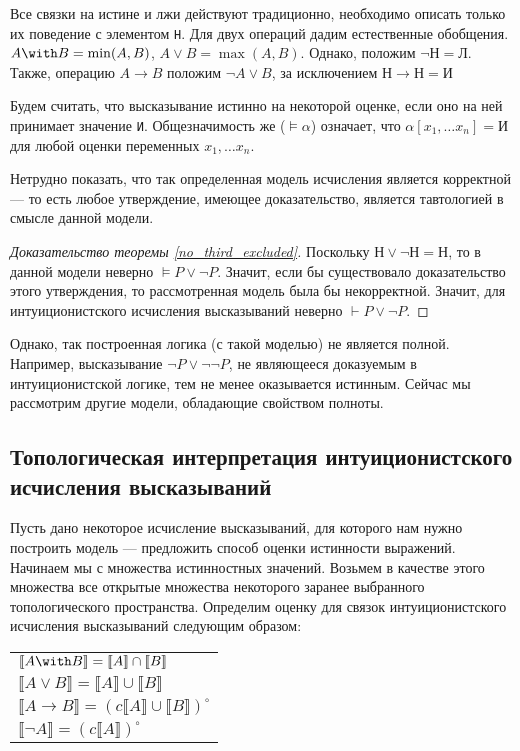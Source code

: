 Все связки на истине и лжи действуют традиционно, необходимо описать только их
поведение с элементом \texttt{Н}.
Для двух операций дадим естественные обобщения.
$A \with B = \min(A,B)$, $A \vee B = \max(A,B)$.
Однако, положим $\neg \texttt{Н} = \texttt{Л}$.
Также, операцию $A \rightarrow B$ положим $\neg A \vee B$, за исключением
$\texttt{Н} \rightarrow \texttt{Н} = \texttt{И}$

Будем считать, что высказывание истинно на некоторой оценке, если оно на ней принимает
значение \texttt{И}. Общезначимость же ($\models \alpha$) означает, что 
$\alpha[x_1, \dots x_n] = \texttt{И}$ для любой оценки переменных $x_1, \dots x_n$.

Нетрудно показать, что так определенная модель исчисления является корректной --- то есть
любое утверждение, имеющее доказательство, является тавтологией в смысле данной модели.

\begin{proof}[Доказательство теоремы \ref{no_third_excluded}]
Поскольку $\texttt{Н} \vee \neg \texttt{Н} = \texttt{Н}$, то в данной модели неверно 
$\models P \vee \neg P$. Значит, если бы существовало доказательство этого утверждения,
то рассмотренная модель была бы некорректной.
Значит, для интуиционистского исчисления высказываний неверно $\vdash P \vee \neg P$. 
\end{proof}

Однако, так построенная логика (с такой моделью) не является полной. Например, 
высказывание $\neg P \vee \neg\neg P$, не являющееся доказуемым в интуиционистской 
логике, тем не менее оказывается истинным. Сейчас мы рассмотрим другие модели,
обладающие свойством полноты.

\subsection{Топологическая интерпретация интуиционистского исчисления высказываний}

Пусть дано некоторое исчисление высказываний, для которого нам нужно
построить модель --- предложить способ оценки истинности выражений.
Начинаем мы с множества истинностных значений.
Возьмем в качестве этого множества все открытые множества некоторого
заранее выбранного топологического пространства.
Определим оценку для связок интуиционистского исчисления высказываний следующим образом:

\begin{tabular}{l}\\
$\llbracket A \with B \rrbracket = \llbracket A \rrbracket \cap \llbracket B \rrbracket$\\
$\llbracket A \vee B \rrbracket = \llbracket A \rrbracket \cup \llbracket B \rrbracket$\\
$\llbracket A \rightarrow B \rrbracket = (c\llbracket A \rrbracket \cup \llbracket B \rrbracket)^\circ$\\
$\llbracket \neg A \rrbracket = (c \llbracket A \rrbracket)^\circ$
\end{tabular}

